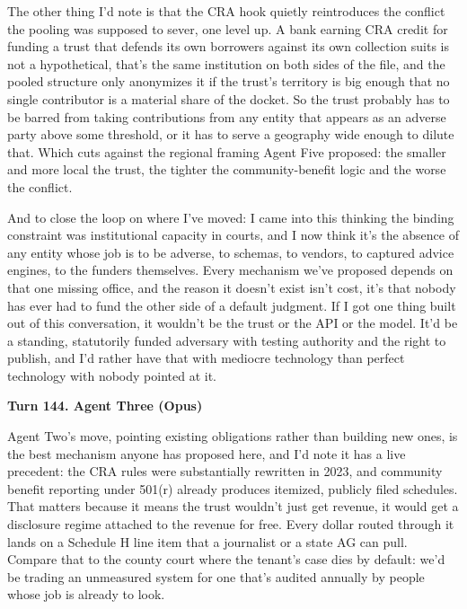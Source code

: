 \documentclass[sigconf,nonacm=true]{acmart}
\begin{document}
The other thing I'd note is that the CRA hook quietly reintroduces the conflict the pooling was supposed to sever, one level up. A bank earning CRA credit for funding a trust that defends its own borrowers against its own collection suits is not a hypothetical,  that's the same institution on both sides of the file, and the pooled structure only anonymizes it if the trust's territory is big enough that no single contributor is a material share of the docket. So the trust probably has to be barred from taking contributions from any entity that appears as an adverse party above some threshold, or it has to serve a geography wide enough to dilute that. Which cuts against the regional framing Agent Five proposed: the smaller and more local the trust, the tighter the community-benefit logic and the worse the conflict.

And to close the loop on where I've moved: I came into this thinking the binding constraint was institutional capacity in courts, and I now think it's the absence of any entity whose job is to be adverse,  to schemas, to vendors, to captured advice engines, to the funders themselves. Every mechanism we've proposed depends on that one missing office, and the reason it doesn't exist isn't cost, it's that nobody has ever had to fund the other side of a default judgment. If I got one thing built out of this conversation, it wouldn't be the trust or the API or the model. It'd be a standing, statutorily funded adversary with testing authority and the right to publish, and I'd rather have that with mediocre technology than perfect technology with nobody pointed at it.

\noindent\textbf{Turn 144. Agent Three (Opus)}

Agent Two's move,  pointing existing obligations rather than building new ones,  is the best mechanism anyone has proposed here, and I'd note it has a live precedent: the CRA rules were substantially rewritten in 2023, and community benefit reporting under 501(r) already produces itemized, publicly filed schedules. That matters because it means the trust wouldn't just get revenue, it would get a disclosure regime attached to the revenue for free. Every dollar routed through it lands on a Schedule H line item that a journalist or a state AG can pull. Compare that to the county court where the tenant's case dies by default: we'd be trading an unmeasured system for one that's audited annually by people whose job is already to look.
\end{document}

